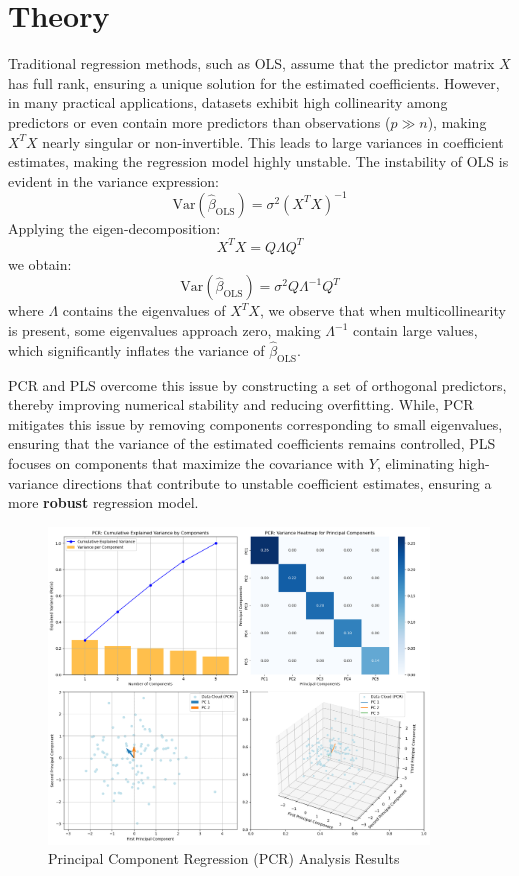 \documentclass[11pt,twoside,a4paper]{article}
\begin{document}
\section{Theory}

Traditional regression methods, such as OLS, assume that the predictor matrix \( X \) has full rank, ensuring a unique solution for the estimated coefficients. However, in many practical applications, datasets exhibit high collinearity among predictors or even contain more predictors than observations (\( p \gg n \)), making \( X^T X \) nearly singular or non-invertible. This leads to large variances in coefficient estimates, making the regression model highly unstable. The instability of OLS is evident in the variance expression:
\[
\text{Var}(\hat{\beta}_{\text{OLS}}) = \sigma^2 (X^T X)^{-1}
\]
Applying the eigen-decomposition:
\[
X^T X = Q \Lambda Q^T
\]
we obtain:
\[
\text{Var}(\hat{\beta}_{\text{OLS}}) = \sigma^2 Q \Lambda^{-1} Q^T
\]
where \( \Lambda \) contains the eigenvalues of \( X^T X \), we observe that when multicollinearity is present, some eigenvalues approach zero, making \( \Lambda^{-1} \) contain large values, which significantly inflates the variance of \( \hat{\beta}_{\text{OLS}} \).

PCR and PLS overcome this issue by constructing a set of orthogonal predictors, thereby improving numerical stability and reducing overfitting. While,  PCR mitigates this issue by removing components corresponding to small eigenvalues, ensuring that the variance of the estimated coefficients remains controlled, PLS focuses on components that maximize the covariance with \( Y \), eliminating high-variance directions that contribute to unstable coefficient estimates, ensuring a more \textbf{robust} regression model.

\begin{figure}[H]
    \centering
    \includegraphics[width=0.9\textwidth]{PCR_Analysis.png}
    \caption{Principal Component Regression (PCR) Analysis Results}
    \label{fig:PCR_analysis}
\end{figure}
\end{document}

